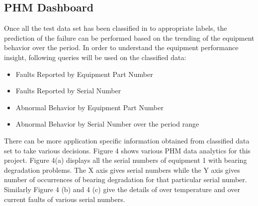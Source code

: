\documentclass[sigconf]{acmart}
\begin{document}
\subsection{PHM Dashboard}
Once all the test data set has been classified in to appropriate labels, the prediction of the failure can be performed based on the trending of the equipment behavior over the period. In order to understand the equipment performance insight, following queries will be used on the classified data:
\begin{itemize}
  \item Faults Reported by Equipment Part Number
  \item Faults Reported by Serial Number
  \item Abnormal Behavior by Equipment Part Number
  \item Abnormal Behavior by Serial Number over the period range
\end{itemize}
There can be more application specific information obtained from classified data set to take various decisions. Figure 4 shows various PHM data analytics for this project. Figure 4(a) displays all the serial numbers of equipment 1 with bearing degradation problems. The X axis gives serial numbers while the Y axis gives number of occurrences of bearing degradation for that particular serial number. Similarly Figure 4 (b) and 4 (c) give the details of over temperature and over current faults of various serial numbers.
\end{document}
